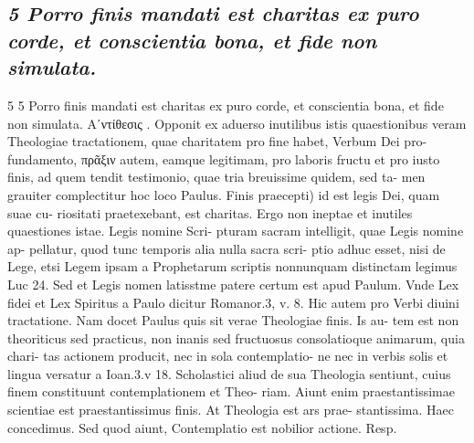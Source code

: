 \documentclass{article}
\begin{document}
\begin{pages}
\subsection*{\textit{5 Porro finis mandati est charitas ex puro corde, et conscientia bona, et fide non simulata.}}5 5 Porro finis mandati est charitas ex puro corde, et conscientia bona, et fide non simulata. Αʹντίθεσις . Opponit ex aduerso inutilibus istis quaestionibus veram Theologiae tractationem, quae charitatem pro fine habet, Verbum Dei pro- fundamento, πρᾶξιν autem, eamque legitimam, pro laboris fructu et pro iusto finis, ad quem tendit testimonio, quae tria breuissime quidem, sed ta- men grauiter complectitur hoc loco Paulus. Finis praecepti) id est legis Dei, quam suae cu- riositati praetexebant, est charitas. Ergo non ineptae et inutiles quaestiones istae. Legis nomine Scri- pturam sacram intelligit, quae Legis nomine ap- pellatur, quod tunc temporis alia nulla sacra scri- ptio adhuc esset, nisi de Lege, etsi Legem ipsam a Prophetarum scriptis nonnunquam distinctam legimus Luc 24. Sed et Legis nomen latisstme patere certum est apud Paulum. Vnde Lex fidei et Lex Spiritus a Paulo dicitur Romanor.3, v. 8. Hic autem pro Verbi diuini tractatione. Nam docet Paulus quis sit verae Theologiae finis. Is au- tem est non theoriticus sed practicus, non inanis sed fructuosus consolatioque animarum, quia chari- tas actionem producit, nec in sola contemplatio- ne nec in verbis solis et lingua versatur a Ioan.3.v 18. Scholastici aliud de sua Theologia sentiunt, cuius finem constituunt contemplationem et Theo- riam. Aiunt enim praestantissimae scientiae est praestantissimus finis. At Theologia est ars prae- stantissima. Haec concedimus. Sed quod aiunt, Contemplatio est nobilior actione. Resp.  \pend

\end{pages}
\end{document}
